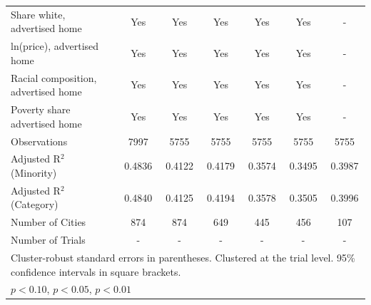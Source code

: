 \begin{table}[htbp]
{\begin{tabular}{l*{6}{c}}
\midrule
Share white, advertised home  & Yes & Yes & Yes & Yes & Yes & - \\
ln(price), advertised home  & Yes & Yes & Yes & Yes & Yes & - \\
Racial composition, advertised home & Yes & Yes & Yes & Yes & Yes & - \\
Poverty share advertised home & Yes & Yes & Yes & Yes & Yes & - \\
Observations & 7997 & 5755 & 5755 & 5755 & 5755 & 5755 \\
Adjusted R$^2$ (Minority) & 0.4836 & 0.4122 & 0.4179 & 0.3574 & 0.3495 & 0.3987 \\
Adjusted R$^2$ (Category) & 0.4840 & 0.4125 & 0.4194 & 0.3578 & 0.3505 & 0.3996 \\
Number of Cities & 874 & 874 & 649 & 445 & 456 & 107 \\
Number of Trials & - & - & - & - & - & - \\
\bottomrule
\multicolumn{7}{l}{\footnotesize Cluster-robust standard errors in parentheses. Clustered at the trial level. 95\% confidence intervals in square brackets.}\\
\multicolumn{7}{l}{\footnotesize \sym{*} \(p<0.10\), \sym{**} \(p<0.05\), \sym{***} \(p<0.01\)}\\
\end{tabular}
}
\end{table}
